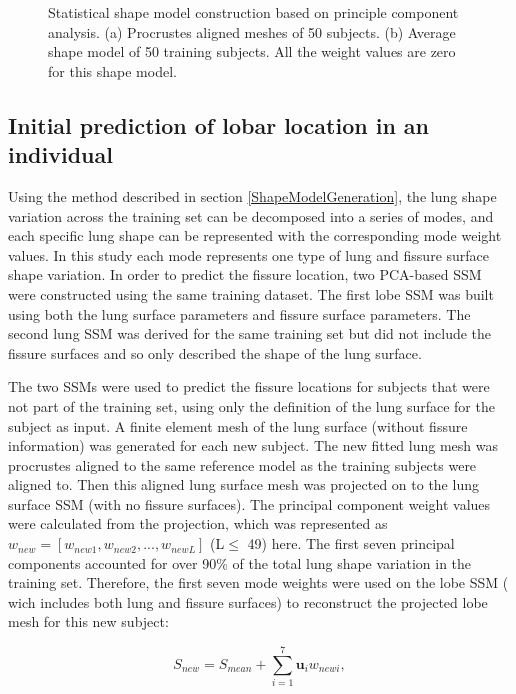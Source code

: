 {\begin{figure}[htbp]
\begin{subfigure}{.4\linewidth}
  \caption{}
  \label{fig:PCAMeshTraining-b} 
\end{subfigure}
\caption{Statistical shape model construction based on principle component analysis. (a) Procrustes aligned meshes of 50 subjects. (b) Average shape model of 50 training subjects. All the weight values are zero for this shape model.}
\label{fig:PCAMeshTraining}
\end{figure}

\subsection{Initial prediction of lobar location in an individual} \label{MeshPrediction}

Using the method described in section \ref{ShapeModelGeneration}, the lung shape variation across the training set can be decomposed into a series of modes, and each specific lung shape can be represented with the corresponding mode weight values. In this study each mode represents one type of lung and fissure surface shape variation. In order to predict the fissure location, two PCA-based SSM were constructed using the same training dataset. The first lobe SSM was built using both the lung surface parameters and fissure surface parameters. The second lung SSM was derived for the same training set but did not include the fissure surfaces and so only described the shape of the lung surface.

The two SSMs were used to predict the fissure locations for subjects that were not part of the training set, using only the definition of the lung surface for the subject as input. A finite element mesh of the lung surface (without fissure information) was generated for each new subject. The new fitted lung mesh was procrustes aligned to the same reference model as the training subjects were aligned to. Then this aligned lung surface mesh was projected on to the lung surface SSM (with no fissure surfaces). The principal component weight values were calculated from the projection, which was represented as $w_{new} = [w_{new1}, w_{new2}, ..., w_{newL}]$ (L$\leq$ 49) here. The first seven principal components accounted for over 90\% of the total lung shape variation in the training set. Therefore, the first seven mode weights were used on the lobe SSM ( wich includes both lung and fissure surfaces) to reconstruct the projected lobe mesh for this new subject:

\begin{equation}
 \label{eq:FissurePrediction1}
 S_{new} = S_{mean} + \sum_{i=1}^7 \mathbf{u}_i w_{newi},
\end{equation}

}
